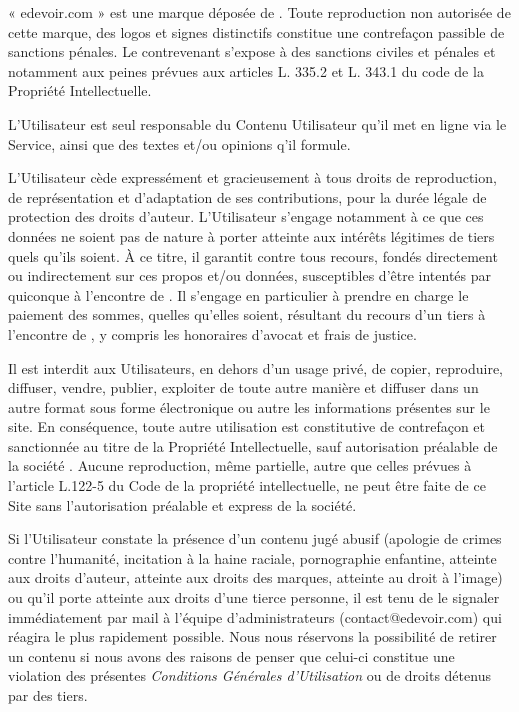 « edevoir.com » est une marque déposée de \eDevoir. Toute reproduction non autorisée de cette marque, des logos et signes distinctifs constitue une contrefaçon passible de sanctions pénales. Le contrevenant s'expose à des sanctions civiles et pénales et notamment aux peines prévues aux articles L. 335.2 et L. 343.1 du code de la Propriété Intellectuelle.

L'Utilisateur est seul responsable du Contenu Utilisateur qu'il met en ligne via le Service, ainsi que des textes et/ou opinions q'il formule.

L'Utilisateur cède expressément et gracieusement à \eDevoir tous droits de reproduction, de représentation et d'adaptation de ses contributions, pour la durée légale de protection des droits d'auteur. L'Utilisateur s'engage notamment à ce que ces données ne soient pas de nature à porter atteinte aux intérêts légitimes de tiers quels qu'ils soient. À ce titre, il garantit \eDevoir contre tous recours, fondés directement ou indirectement sur ces propos et/ou données, susceptibles d'être intentés par quiconque à l'encontre de \eDevoir. Il s'engage en particulier à prendre en charge le paiement des sommes, quelles qu'elles soient, résultant du recours d'un tiers à l'encontre de \eDevoir, y compris les honoraires d'avocat et frais de justice.

Il est interdit aux Utilisateurs, en dehors d'un usage privé, de copier, reproduire, diffuser, vendre, publier, exploiter de toute autre manière et diffuser dans un autre format sous forme électronique ou autre les informations présentes sur le site. En conséquence, toute autre utilisation est constitutive de contrefaçon et sanctionnée au titre de la Propriété Intellectuelle, sauf autorisation préalable de la société \eDevoir. Aucune reproduction, même partielle, autre que celles prévues à l'article L.122-5 du Code de la propriété intellectuelle, ne peut être faite de ce Site sans l'autorisation préalable et express de la société.

Si l'Utilisateur constate la présence d'un contenu jugé abusif (apologie de crimes contre l'humanité, incitation à la haine raciale, pornographie enfantine, atteinte aux droits d'auteur, atteinte aux droits des marques, atteinte au droit à l'image) ou qu'il porte atteinte aux droits d'une tierce personne, il est tenu de le signaler immédiatement par mail à l'équipe d'administrateurs (contact@edevoir.com) qui réagira le plus rapidement possible. Nous nous réservons la possibilité de retirer un contenu si nous avons des raisons de penser que celui-ci constitue une violation des présentes \textit{Conditions Générales d'Utilisation} ou de droits détenus par des tiers.

